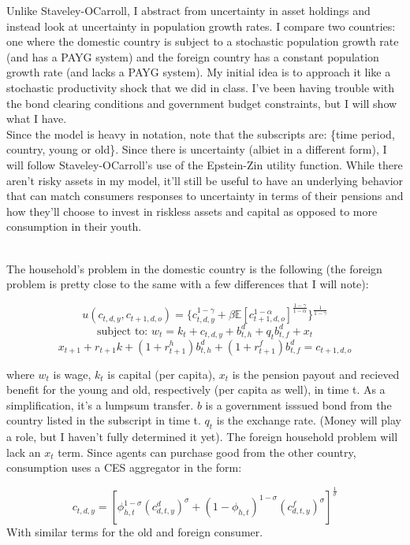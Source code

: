 \documentclass[dvips,12pt]{article}
\begin{document}
Unlike Staveley-OCarroll, I abstract from uncertainty
in asset holdings and instead look at uncertainty in population growth rates. I compare two
countries: one where the domestic country is subject to a stochastic population growth rate (and has a PAYG system)
and the foreign country has a constant population growth rate (and lacks a PAYG system). My initial idea is to approach it like a stochastic productivity shock that we did in class. I've been having trouble with the bond clearing conditions and government budget constraints, but I will show what I have.\\

Since the model is heavy in 
notation, note that the subscripts are: \{time period, country, young or old\}.
Since there is uncertainty (albiet in a different form), I will follow Staveley-OCarroll's
use of the Epstein-Zin utility function. While there aren't risky assets in my model,
it'll still be useful to have an underlying behavior that can match consumers responses 
to uncertainty in terms of their pensions and how they'll choose to invest in 
riskless assets and capital as opposed to more consumption in their youth.

\\The household's problem in the domestic country is the following (the foreign problem is pretty close to the same with a few differences that I will note):


\[u(c_{t,d,y},c_{t+1,d,o})= \big\{ c_{t,d,y}^{1-\gamma}+\beta \mathds{E} [ c_{t+1,d,o}^{1-\alpha} ]^{\frac{1-\gamma}{1-\alpha}} \big\}^{\frac{1}{1-\gamma}} \]
\[\text{subject to: } w_t = k_t + c_{t,d,y} + b^d_{t,h} + q_t b^d_{t,f} + x_t \]
\[x_{t+1} + r_{t+1}k + (1+r^h_{t+1}) b^d_{t,h} + (1+r^f_{t+1})b^d_{t,f} = c_{t+1,d,o}\]

where $w_t$ is wage, $k_t$ is capital (per capita), $x_t$ is the pension payout and recieved benefit for the young and old, respectively (per capita as well), in time t. As a simplification, it's a lumpsum transfer. $b$ is a government isssued bond from the country listed in the subscript in time t. $q_t$ is the exchange rate. (Money will play a role, but I haven't fully determined it yet). The foreign household problem will lack an $x_t$ term.
Since agents can purchase good from the other country, consumption uses a CES aggregator in the form:

\[c_{t,d,y}=[\phi_{h,t}^{1-\sigma}(c_{d,t,y}^{d})^\sigma+(1-\phi_{h,t})^{1-\sigma}(c_{d,t,y}^f)^\sigma]^\frac{1}{\sigma}\]
With similar terms for the old and foreign consumer.
\end{document}
